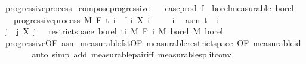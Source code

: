 \begin{isabellebody}
\ progressive{\isacharunderscore}{\kern0pt}process\isanewline
{}\isanewline
\isanewline
{}\isamarkupfalse%
\ compose{\isacharunderscore}{\kern0pt}progressive{\isacharcolon}{\kern0pt}\isanewline
\ \ \ {\isachardoublequoteopen}case{\isacharunderscore}{\kern0pt}prod\ f\ {\isasymin}\ borel{\isacharunderscore}{\kern0pt}measurable\ borel{\isachardoublequoteclose}\isanewline
\ \ \ {\isachardoublequoteopen}progressive{\isacharunderscore}{\kern0pt}process\ M\ F\ t\ {\isacharparenleft}{\kern0pt}{\isasymlambda}i\ {\isasymxi}{\isachardot}{\kern0pt}\ {\isacharparenleft}{\kern0pt}f\ i{\isacharparenright}{\kern0pt}\ {\isacharparenleft}{\kern0pt}X\ i\ {\isasymxi}{\isacharparenright}{\kern0pt}{\isacharparenright}{\kern0pt}{\isachardoublequoteclose}\isanewline
%
\isadelimproof
%
\endisadelimproof
%
\isatagproof
{}\isamarkupfalse%
\isanewline
\ \ \isamarkupfalse%
\ i\ \isamarkupfalse%
\ asm{\isacharcolon}{\kern0pt}\ {\isachardoublequoteopen}t\ {\isasymle}\ i{\isachardoublequoteclose}\isanewline
\ \ \isamarkupfalse%
\ {\isachardoublequoteopen}{\isacharparenleft}{\kern0pt}{\isasymlambda}{\isacharparenleft}{\kern0pt}j{\isacharcomma}{\kern0pt}\ {\isasymxi}{\isacharparenright}{\kern0pt}{\isachardot}{\kern0pt}\ {\isacharparenleft}{\kern0pt}j{\isacharcomma}{\kern0pt}\ X\ j\ {\isasymxi}{\isacharparenright}{\kern0pt}{\isacharparenright}{\kern0pt}\ {\isasymin}\ {\isacharparenleft}{\kern0pt}restrict{\isacharunderscore}{\kern0pt}space\ borel\ {\isacharbraceleft}{\kern0pt}ti{\isacharbraceright}{\kern0pt}\ {\isasymOtimes}\isactrlsub M\ F\ i{\isacharparenright}{\kern0pt}\ {\isasymrightarrow}\isactrlsub M\ borel\ {\isasymOtimes}\isactrlsub M\ borel{\isachardoublequoteclose}\ \isanewline
\ \ \ \ \isamarkupfalse%
\ progressive{\isacharbrackleft}{\kern0pt}OF\ asm{\isacharbrackright}{\kern0pt}\ measurable{\isacharunderscore}{\kern0pt}fst{\isacharprime}{\kern0pt}{\isacharprime}{\kern0pt}{\isacharbrackleft}{\kern0pt}OF\ measurable{\isacharunderscore}{\kern0pt}restrict{\isacharunderscore}{\kern0pt}space{}{\isacharcomma}{\kern0pt}\ OF\ measurable{\isacharunderscore}{\kern0pt}id{\isacharbrackright}{\kern0pt}\ \isanewline
\ \ \ \ \isamarkupfalse%
\ {\isacharparenleft}{\kern0pt}auto\ simp\ add{\isacharcolon}{\kern0pt}\ measurable{\isacharunderscore}{\kern0pt}pair{\isacharunderscore}{\kern0pt}iff\ measurable{\isacharunderscore}{\kern0pt}split{\isacharunderscore}{\kern0pt}conv{\isacharparenright}{\kern0pt}\isanewline

\end{isabellebody}
